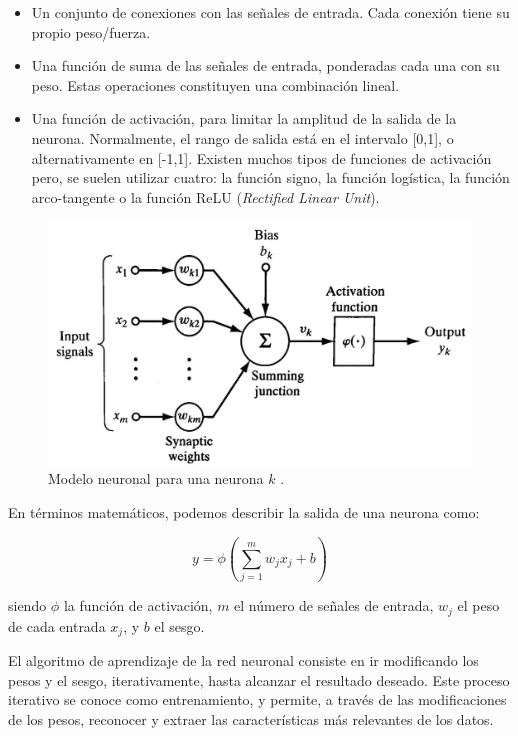 \begin{itemize}
	\item Un conjunto de conexiones con las señales de entrada. Cada conexión tiene su propio peso/fuerza.
	\item Una función de suma de las señales de entrada, ponderadas cada una con su peso. Estas operaciones constituyen una combinación lineal.
	\item Una función de activación, para limitar la amplitud de la salida de la neurona. Normalmente, el rango de salida está en el intervalo [0,1], o alternativamente en [-1,1]. Existen muchos tipos de funciones de activación pero, se suelen utilizar cuatro: la función signo, la función logística, la función arco-tangente o la función ReLU (\textit{Rectified Linear Unit}).
\end{itemize} 

\begin{figure}[h]
	\centering
	\includegraphics[scale=0.25]{imagenes/cap2/neuron-model.png}
	\caption[Modelo neuronal.]{Modelo neuronal para una neurona $k$ \cite{25}.}
	\label{fig5}
\end{figure}

En términos matemáticos, podemos describir la salida de una neurona como:

\begin{equation}
	y = \phi(\sum_{j=1}^{m} w_j x_j + b)
\end{equation}

siendo $\phi$ la función de activación, $m$ el número de señales de entrada, $w_j$ el peso de cada entrada $x_j$, y $b$ el sesgo.

El algoritmo de aprendizaje de la red neuronal consiste en ir modificando los pesos y el sesgo, iterativamente, hasta alcanzar el resultado deseado. Este proceso iterativo se conoce como entrenamiento, y permite, a través de las modificaciones de los pesos, reconocer y extraer las características más relevantes de los datos.

